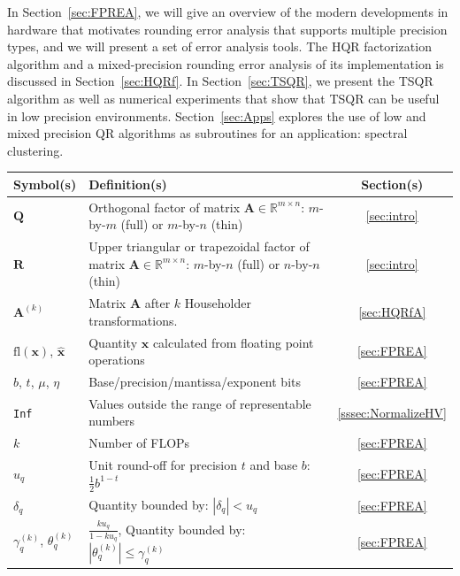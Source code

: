 \documentclass[review,onefignum,onetabnum]{siamart190516}
\newcommand{\R}{\mathbb{R}}
\newcommand{\dd}{\delta}
\newcommand{\tth}{\theta}
\newcommand{\bb}[1]{\mathbf{#1}}
\newcommand{\fl}{\mathrm{fl}}
\begin{document}
In Section~\ref{sec:FPREA}, we will give an overview of the modern developments in hardware that motivates rounding error analysis that supports multiple precision types, and we will present a set of error analysis tools. 
The HQR factorization algorithm and a mixed-precision rounding error analysis of its implementation is discussed in Section~\ref{sec:HQRf}.
In Section~\ref{sec:TSQR}, we present the TSQR algorithm as well as numerical experiments that show that TSQR can be useful in low precision environments. Section~\ref{sec:Apps} explores the use of low and mixed precision QR algorithms as subroutines for an application: spectral clustering. 
\begin{table}[h!]
	\centering
	\begin{tabular}{|m{3cm}|m{9cm}|c|}
		\hline
		Symbol(s) & Definition(s) & Section(s) \\
		\hline
		$\bb{Q}$  & Orthogonal factor of matrix $\bb{A}\in\R^{m\times n}$: $m$-by-$m$ (full) or $m$-by-$n$ (thin)  & \ref{sec:intro}\\
		$\bb{R}$ & Upper triangular or trapezoidal factor of matrix $\bb{A}\in\R^{m\times n}$:  $m$-by-$n$ (full) or $n$-by-$n$ (thin)  &  \ref{sec:intro}\\ 
		$\bb{A}^{(k)}$ & Matrix $\bb{A}$ after $k$ Householder transformations. &\ref{sec:HQRfA}\\
		\hline
		$\fl(\bb{x})$, $\hat{\bb{x}}$ & Quantity $\bb{x}$ calculated from floating point operations & \ref{sec:FPREA} \\
		$b$, $t$, $\mu$, $\eta$  & Base/precision/mantissa/exponent bits & \ref{sec:FPREA} \\
		\tt{Inf} & Values outside the range of representable numbers & \ref{sssec:NormalizeHV} \\ %
		$k$ & Number of FLOPs &  \ref{sec:FPREA}\\
		$u_q$ & Unit round-off for precision $t$ and base $b$: $\frac{1}{2}b^{1-t}$ & \ref{sec:FPREA} \\  
		$\dd_{q}$ &Quantity bounded by: $|\dd_{q}| < u_q$ &  \ref{sec:FPREA} \\
		$\gamma_{q}^{(k)}$,  $\tth_{q}^{(k)}$& $\frac{ku_q}{1-ku_q}$, Quantity bounded by: $|\tth_{q}^{(k)}|\leq\gamma_q^{(k)}$ &  \ref{sec:FPREA} \\

\end{tabular}
\end{table}
\end{document}
